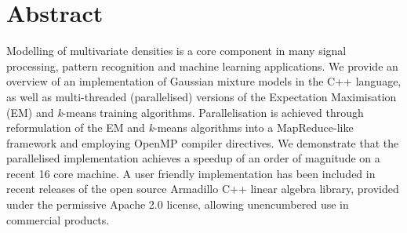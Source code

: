 \section*{Abstract}

Modelling of multivariate densities is a core component in many signal processing, pattern recognition and machine learning applications.
We provide an overview of an implementation of Gaussian mixture models in the C++ language,
as well as multi-threaded (parallelised) versions of the Expectation Maximisation (EM) and {\it k}-means training algorithms.
Parallelisation is achieved through reformulation of the EM and {\it k}-means algorithms into a MapReduce-like framework
and employing OpenMP compiler directives.
We demonstrate that the parallelised implementation achieves a speedup of an order of magnitude on a recent 16 core machine.
A user friendly implementation has been included in recent releases of the open source Armadillo C++ linear algebra library,
provided under the permissive Apache 2.0 license,
allowing unencumbered use in commercial products.
